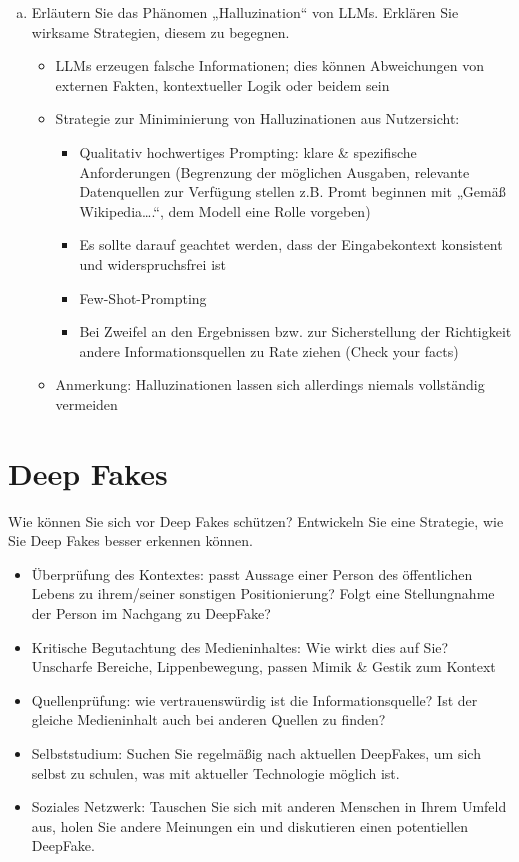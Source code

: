 \documentclass[12pt,ngerman]{AssignmentClass}
\begin{document}
\begin{enumerate}[a)]
            \item Erläutern Sie das Phänomen „Halluzination“ von LLMs. Erklären Sie wirksame Strategien, diesem zu begegnen.\
            \begin{itemize}
                \item LLMs erzeugen falsche Informationen; dies können Abweichungen von externen Fakten, kontextueller Logik oder beidem sein
                \item Strategie zur Miniminierung von Halluzinationen aus Nutzersicht:
                \begin{itemize}
                    \item Qualitativ hochwertiges Prompting: klare \& spezifische Anforderungen (Begrenzung der möglichen Ausgaben, relevante Datenquellen zur Verfügung stellen z.B. Promt beginnen mit „Gemäß Wikipedia….“, dem Modell eine Rolle vorgeben)
                    \item Es sollte darauf geachtet werden, dass der Eingabekontext konsistent und widerspruchsfrei ist
                    \item Few-Shot-Prompting
                    \item Bei Zweifel an den Ergebnissen bzw. zur Sicherstellung der Richtigkeit andere Informationsquellen zu Rate ziehen (Check your facts)
                \end{itemize}
                \item Anmerkung: Halluzinationen lassen sich allerdings niemals vollständig vermeiden
            \end{itemize}
        \end{enumerate}

    
    \section{Deep Fakes}
        Wie können Sie sich vor Deep Fakes schützen? Entwickeln Sie eine Strategie, wie Sie Deep Fakes besser erkennen können.
        \begin{itemize}
            \item Überprüfung des Kontextes: passt Aussage einer Person des öffentlichen Lebens zu ihrem/seiner sonstigen Positionierung? Folgt eine Stellungnahme der Person im Nachgang zu DeepFake?
            \item Kritische Begutachtung des Medieninhaltes: Wie wirkt dies auf Sie? Unscharfe Bereiche, Lippenbewegung, passen Mimik \& Gestik zum Kontext
            \item Quellenprüfung: wie vertrauenswürdig ist die Informationsquelle? Ist der gleiche Medieninhalt auch bei anderen Quellen zu finden?
            \item Selbststudium: Suchen Sie regelmäßig nach aktuellen DeepFakes, um sich selbst zu schulen, was mit aktueller Technologie möglich ist.
            \item Soziales Netzwerk: Tauschen Sie sich mit anderen Menschen in Ihrem Umfeld aus, holen Sie andere Meinungen ein und diskutieren einen potentiellen DeepFake.
        \end{itemize}
\end{document}
